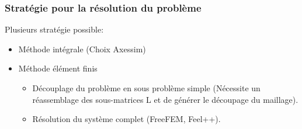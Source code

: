 \begin{frame}
  \frametitle{Stratégie pour la résolution du problème}
  Plusieurs stratégie possible:
  \begin{itemize}
    \item Méthode intégrale (Choix Axessim)
    \item Méthode élément finis
    \begin{itemize}
    \item Découplage du problème en sous problème simple (Nécessite
      un réassemblage des sous-matrices L et de générer le découpage du maillage).
    \item Résolution du système complet (FreeFEM, Feel++).
    \end{itemize}
  \end{itemize}
\end{frame}

